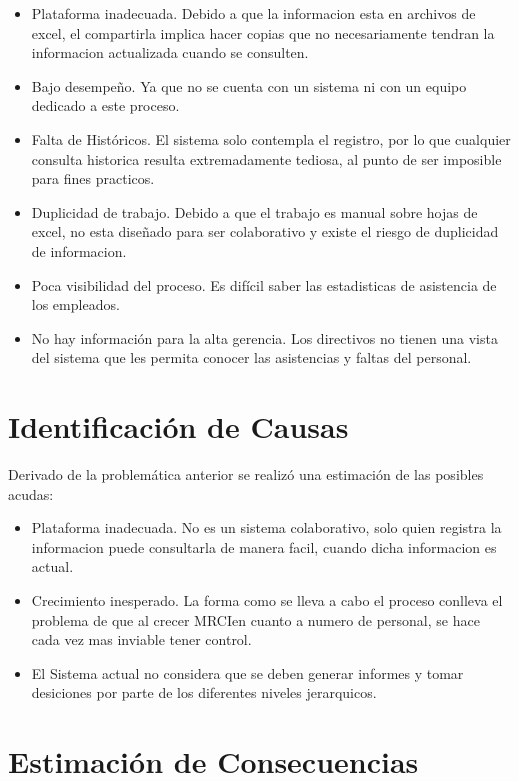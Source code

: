 \documentclass[10pt]{book}
\newcommand{\cliente}{MRCI}
\begin{document}
	\begin{itemize}
		\item Plataforma inadecuada. Debido a que la informacion esta en archivos de excel, el compartirla implica hacer copias que no necesariamente tendran la informacion actualizada cuando se consulten.
		\item Bajo desempeño. Ya que no se cuenta con un sistema ni con un equipo dedicado a este proceso.
		\item Falta de Históricos. El sistema solo contempla el registro, por lo que cualquier consulta historica resulta extremadamente tediosa, al punto de ser imposible para fines practicos.
		\item Duplicidad de trabajo. Debido a que el trabajo es manual sobre hojas de excel, no esta diseñado para ser colaborativo y existe el riesgo de duplicidad de informacion.
		\item Poca visibilidad del proceso. Es difícil saber las estadisticas de asistencia de los empleados.
		\item No hay información para la alta gerencia. Los directivos no tienen una vista del sistema que les permita conocer las asistencias y faltas del personal.
	\end{itemize}

\section{Identificación de Causas}

Derivado de la problemática anterior se realizó una estimación de las posibles acudas:

\begin{itemize}	
	\item Plataforma inadecuada. No es un sistema colaborativo, solo quien registra la informacion puede consultarla de manera facil, cuando dicha informacion es actual.
	\item Crecimiento inesperado. La forma como se lleva a cabo el proceso conlleva el problema de que al crecer \cliente en cuanto a numero de personal, se hace cada vez mas inviable tener control.
	\item El Sistema actual no considera que se deben generar informes y tomar desiciones por parte de los diferentes niveles jerarquicos.
\end{itemize}

\section{Estimación de Consecuencias}
\end{document}
